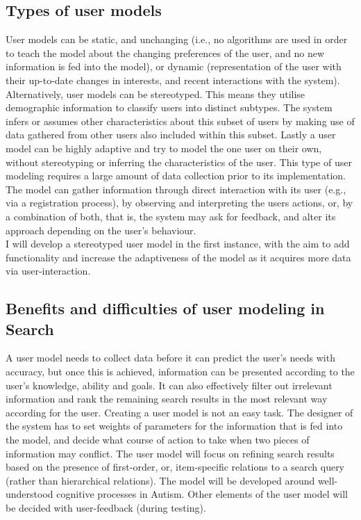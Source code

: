 \documentclass[10pt]{article}
\begin{document}
\subsection{Types of user models}
User models can be static, and unchanging (i.e., no algorithms are used in order to teach the model about the changing preferences of the user, and no new information is fed into the model), or dynamic (representation of the user with their up-to-date changes in interests, and recent interactions with the system). Alternatively, user models can be stereotyped. This means they utilise demographic information to classify users into distinct subtypes. The system infers or assumes other characteristics about this subset of users by making use of data gathered from other users also included within this subset. Lastly a user model can be highly adaptive and try to model the one user on their own, without stereotyping or inferring the characteristics of the user. This type of user modeling requires a large amount of data collection prior to its implementation.\\
The model can gather information through direct interaction with its user (e.g., via a registration process), by observing and interpreting the users actions, or, by a combination of both, that is, the system may ask for feedback, and alter its approach depending on the user’s behaviour.\\
I will develop a stereotyped user model in the first instance, with the aim to add functionality and increase the adaptiveness of the model as it acquires more data via user-interaction.

\subsection{Benefits and difficulties of user modeling in Search}
A user model needs to collect data before it can predict the user’s needs with accuracy, but once this is achieved, information can be presented according to the user’s knowledge, ability and goals. It can also effectively filter out irrelevant information and rank the remaining search results in the most relevant way according for the user.
Creating a user model is not an easy task. The designer of the system has to set weights of parameters for the information that is fed into the model, and decide what course of action to take when two pieces of information may conflict. The user model will focus on refining search results based on the presence of first-order, or, item-specific relations to a search query (rather than hierarchical relations). The model will be developed around well-understood cognitive processes in Autism. Other elements of the user model will be decided with user-feedback (during testing). 
\end{document}
